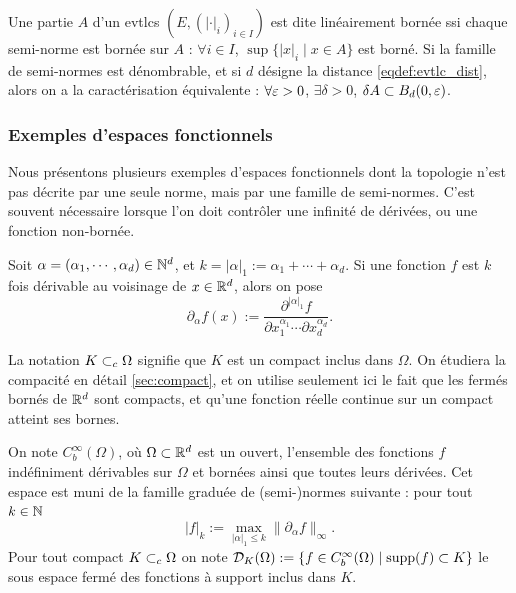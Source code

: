 \begin{definition}
\label{def:lineairBorne}
%
	Une partie $A$ d'un evtlcs $(E,(|\cdot|_i)_{i \in I})$ est dite linéairement bornée ssi chaque semi-norme est bornée sur $A$ : $\forall i \in I$, $\sup\{|x|_i\mid x\in A\}$ est borné. 	
	Si la famille de semi-normes est dénombrable, et si $d$ désigne la distance \eqref{eqdef:evtlc_dist}, alors on a la caractérisation équivalente : $\forall \varepsilon>0$, $\exists \delta>0$, $\delta A \subset B_d(0,\varepsilon)$. 
\end{definition}

\subsubsection{Exemples d'espaces fonctionnels}

Nous présentons plusieurs exemples d'espaces fonctionnels dont la topologie n'est pas décrite par une seule norme, mais par une famille de semi-normes. C'est souvent nécessaire lorsque l'on doit contrôler une infinité de dérivées, ou une fonction non-bornée. 

Soit $\alpha = (\alpha_1,\cdots,\alpha_d) \in \mathbb{N}^d$, et $k = |\alpha|_1 := \alpha_1+\cdots+\alpha_d $. Si une fonction $f$ est $k$ fois dérivable au voisinage de $x \in \mathbb{R}^d$, alors on pose
\begin{equation*}
	\partial_\alpha f(x) := \frac{\partial^{|\alpha|_1} f}{\partial x_1^{\alpha_1}\cdots \partial x_d^{\alpha_d}}.
\end{equation*}

La notation $K \subset_c \Omega$ signifie que $K$ est un compact inclus dans $\Omega$. On étudiera la compacité en détail \cref{sec:compact}, et on utilise seulement ici le fait que les fermés bornés de $\mathbb{R}^d$ sont compacts, et qu'une fonction réelle continue sur un compact atteint ses bornes.

\begin{definition}	
\label{def:cinf_bornee}
%
On note $C^\infty_b(\Omega)$, où $\Omega\subset \mathbb{R}^d$ est un ouvert, l'ensemble des fonctions $f$ indéfiniment dérivables sur $\Omega$ et bornées ainsi que toutes leurs dérivées. Cet espace est muni de la famille graduée de (semi-)normes suivante : pour tout $k \in \mathbb{N}$
\begin{equation*}
	|f|_k := \max_{|\alpha|_1 \leq k} \|\partial_\alpha f\|_\infty.
\end{equation*}
Pour tout compact $K \subset_c \Omega$ on note $\mathcal{D}_K(\Omega) := \{f \in C^\infty_b(\Omega) \mid \operatorname{supp}(f) \subset K\}$ le sous espace fermé des fonctions à support inclus dans $K$. 
\end{definition}

